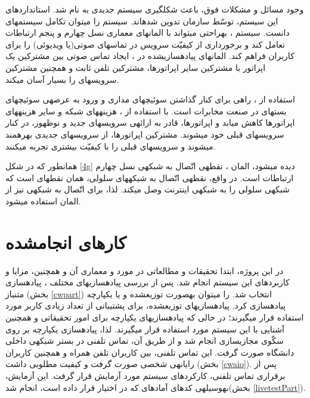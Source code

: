 وجود مسائل و مشکلات فوق، باعث شکل\nf گیری سیستم جدیدی به نام  شد. استانداردهای این سیستم، توسّط سازمان  تدوین شده\nf اند. سیستم  را می\nf توان تکامل سیستم\nf های  دانست. سیستم ، به\nf راحتی می\nf تواند با المان\nf های معماری نسل چهارم و پنجم ارتباطات تعامل کند و برخورداری از کیفیّت سرویس در تماس\nf های صوتی(یا ویدیوئی) را برای کاربران فراهم کند. المان\nf های پیاده\nf سازی\nf شده در ، ایجاد تماس صوتی بین مشترکین یک اپراتور با مشترکین سایر اپراتورها، مشترکین تلفن ثابت و همچنین مشترکین سرویس\nf های  را بسیار آسان می\nf کند. 

استفاده از ، راهی برای کنار گذاشتن سوئیچ\nf های مداری و ورود به عرصه\nf ی سوئیچ\nf های بسته\nf ای در صنعت مخابرات است. با استفاده از ، هزینه\nf های شبکه و سایر هزینه\nf های اپراتورها کاهش میابد و اپراتورها، قادر به ارائه\nf ی سرویس\nf های جدید و نوظهور، در کنار سرویس\nf های قبلی خود می\nf شوند. مشترکین اپراتورها، از سرویس\nf های جدیدی بهره\nf مند می\nf شوند و سرویس\nf های قبلی را با کیفیّت بیشتری تجربه می\nf کنند\cite{blended}.

همان\nf طور که در شکل \ref{4g} دیده می\nf شود، المان ، نقطه\nf ی اتّصال  به شبکه\nf ی نسل چهارم ارتباطات است.  در واقع، نقطه\nf ی اتّصال  به شبکه\nf های سلولی، همان نقطه\nf ای است که شبکه\nf ی سلولی را به شبکه\nf ی اینترنت وصل می\nf کند. لذا، برای اتّصال  به شبکه\nf ی  نیز از المان  استفاده می\nf شود.

\section{کارهای انجام\nf شده}

در این پروژه، ابتدا تحقیقات و مطالعاتی در مورد  و معماری آن و همچنین، مزایا و کاربردهای این سیستم انجام شد. پس از بررسی پیاده\nf سازی\nf های مختلف ، پیاده\nf سازی متن\nf باز (بخش \ref{cwpart}) انتخاب شد.  را می\nf توان به\nf صورت توزیع\nf شده و یا یکپارچه پیاده\nf سازی کرد. پیاده\nf سازی\nf های توزیع\nf شده، برای پشتیبانی از تعداد زیادی کاربر مورد استفاده قرار می\nf گیرند؛ در حالی که پیاده\nf سازی\nf های یکپارچه برای امور تحقیقاتی و همچنین آشنایی با این سیستم مورد استفاده قرار می\nf گیرند. لذا، پیاده\nf سازی یکپارچه بر روی سکّوی مجازی\nf سازی انجام شد و از طریق آن، تماس تلفنی در بستر شبکه\nf ی داخلی دانشگاه صورت گرفت. این تماس تلفنی، بین کاربران تلفن همراه و همچنین کاربران رایانه\nf ی شخصی صورت گرفت و کیفیت مطلوبی داشت (بخش \ref{cwaio}). پس از برقراری تماس تلفنی، کارکردهای سیستم مورد آزمایش قرار گرفت. این آزمایش، به\nf وسیله\nf ی کدهای آماده\nf ای که  در اختیار قرار داده است، انجام شد(بخش \ref{livetestPart}). 

